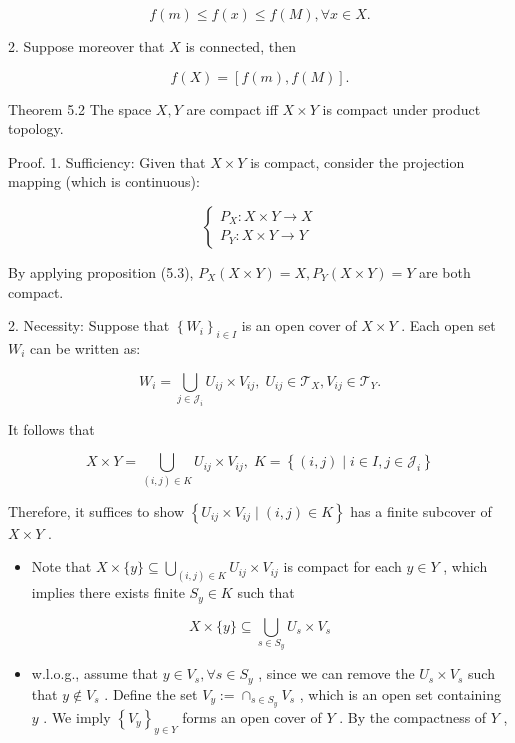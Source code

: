 \[
f\left( m\right)  \leq  f\left( x\right)  \leq  f\left( M\right) ,\forall x \in  X.
\]

2. Suppose moreover that \(X\) is connected, then

\[
f\left( X\right)  = \left\lbrack  {f\left( m\right) ,f\left( M\right) }\right\rbrack  .
\]

Theorem 5.2 The space \(X,Y\) are compact iff \(X \times  Y\) is compact under product topology.

Proof. 1. Sufficiency: Given that \(X \times  Y\) is compact, consider the projection mapping (which is continuous):

\[
\left\{  \begin{array}{l} {P}_{X} : X \times  Y \rightarrow  X \\  {P}_{Y} : X \times  Y \rightarrow  Y \end{array}\right.
\]

By applying proposition (5.3), \({P}_{X}\left( {X \times  Y}\right)  = X,{P}_{Y}\left( {X \times  Y}\right)  = Y\) are both compact.

2. Necessity: Suppose that \({\left\{  {W}_{i}\right\}  }_{i \in  I}\) is an open cover of \(X \times  Y\) . Each open set \({W}_{i}\) can be written as:

\[
{W}_{i} = \mathop{\bigcup }\limits_{{j \in  {\mathcal{J}}_{i}}}{U}_{ij} \times  {V}_{ij},\;{U}_{ij} \in  {\mathcal{T}}_{X},{V}_{ij} \in  {\mathcal{T}}_{Y}.
\]

It follows that

\[
X \times  Y = \mathop{\bigcup }\limits_{{\left( {i,j}\right)  \in  K}}{U}_{ij} \times  {V}_{ij},\;K = \left\{  {\left( {i,j}\right)  \mid  i \in  I,j \in  {\mathcal{J}}_{i}}\right\}
\]

Therefore, it suffices to show \(\left\{  {{U}_{ij} \times  {V}_{ij} \mid  \left( {i,j}\right)  \in  K}\right\}\) has a finite subcover of \(X \times  Y\) .

\begin{itemize}
\item Note that \(X \times  \{ y\}  \subseteq  \mathop{\bigcup }\limits_{{\left( {i,j}\right)  \in  K}}{U}_{ij} \times  {V}_{ij}\) is compact for each \(y \in  Y\) , which implies there exists finite \({S}_{y} \in  K\) such that
\end{itemize}

\[
X \times  \{ y\}  \subseteq  \mathop{\bigcup }\limits_{{s \in  {S}_{y}}}{U}_{s} \times  {V}_{s}
\]

\begin{itemize}
\item w.l.o.g., assume that \(y \in  {V}_{s},\forall s \in  {S}_{y}\) , since we can remove the \({U}_{s} \times  {V}_{s}\) such that \(y \notin  {V}_{s}\) . Define the set \({V}_{y} \mathrel{\text{ := }} { \cap  }_{s \in  {S}_{y}}{V}_{s}\) , which is an open set containing \(y\) . We imply \({\left\{  {V}_{y}\right\}  }_{y \in  Y}\) forms an open cover of \(Y\) . By the compactness of \(Y\) ,
\end{itemize}

